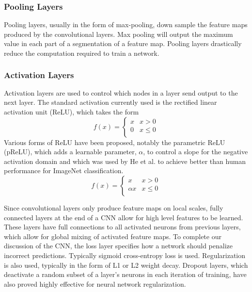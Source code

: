 \subsubsection{Pooling Layers}
Pooling layers, usually in the form of max-pooling, down sample the feature maps produced by the convolutional layers. Max pooling will output the maximum value in each part of a segmentation of a feature map. Pooling layers drastically reduce the computation required to train a network. 

\subsubsection{Activation Layers}
Activation layers are used to control which nodes in a layer send output to the next layer. The standard activation currently used is the rectified linear activation unit (ReLU), which takes the form
\begin{equation}
f(x) = \begin{cases}
x & x > 0 \\
0 & x\leq 0 \\
\end{cases}
\end{equation}
Various forms of ReLU have been proposed, notably the parametric ReLU (pReLU), which adds a learnable parameter, $\alpha$, to control a slope for the negative activation domain and which was used by He et al. to achieve better than human performance for ImageNet classification.\cite{he2016deep}
\begin{equation}
f(x) = \begin{cases}
x & x > 0 \\
\alpha x & x \leq 0 \\
\end{cases}
\end{equation}

Since convolutional layers only produce feature maps on local scales, fully connected layers at the end of a CNN allow for high level features to be learned. These layers have full connections to all activated neurons from previous layers, which allow for global mixing of activated feature maps. To complete our discussion of the CNN, the loss layer specifies how a network should penalize incorrect predictions. Typically sigmoid cross-entropy loss is used. Regularization is also used, typically in the form of L1 or L2 weight decay. Dropout layers, which deactivate a random subset of a layer's neurons in each iteration of training, have also proved highly effective for neural network regularization.\cite{srivastava2014dropout}

